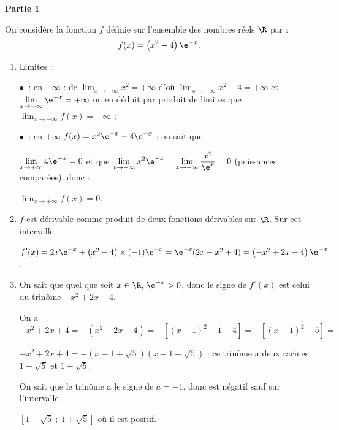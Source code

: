 
\medskip

\textbf{Partie 1}

\medskip

On considère la fonction $f$ définie sur l'ensemble des nombres réels $\R$ par :
\[f(x) = \left(x^2 - 4\right)\e^{-x}.\]


\begin{enumerate}
\item Limites :%

$\bullet~$ : en $- \infty$ : de $\displaystyle\lim_{x \to - \infty}x^2 = + \infty$ d'où 
$\displaystyle\lim_{x \to - \infty}x^2 - 4 = + \infty$ et $\displaystyle\lim_{x \to - \infty}\e^{-x} =
 + \infty$ on en déduit par produit de limites que $\displaystyle\lim_{x \to - \infty} f(x) = + \infty$ ;

$\bullet~$ : en $+ \infty$ $f(x) = x^2\e^{-x} - 4\e^{-x}$ : on sait que 

$\displaystyle\lim_{x \to + \infty}4\e^{-x} = 0$ et que $\displaystyle\lim_{x \to + \infty}x^2\e^{-x} = \displaystyle\lim_{x \to + \infty}\dfrac{x^2}{\e^x} =  0$ (puissances comparées), donc :

$\displaystyle\lim_{x \to + \infty} f(x) = 0$.
\item %
$f$ est dérivable comme produit de deux fonctions dérivables sur $\R$. Sur cet intervalle :

$f'(x) = 2x\e^{-x} + \left(x^2 - 4\right) \times (- 1)\e^{-x} = \e^{-x}(2x - x^2 + 4) = \left(- x^2 + 2x + 4\right)\e^{-x}$.
\item %
On sait que quel que soit $x \in\R,\, \e^{-x} > 0$, donc le signe de $f'(x)$ est celui du trinôme $- x^2 + 2x + 4$.

On a $- x^2 + 2x + 4 = -\left(x^2 - 2x - 4\right) = -\left[(x - 1)^2 - 1 - 4\right] = -\left[(x - 1)^2 - 5\right] =$

$- x^2 + 2x + 4 = - \left(x - 1 + \sqrt 5\right)\left(x - 1 - \sqrt 5\right)$ : ce trinôme a deux racines $1 - \sqrt 5$ et $1 + \sqrt 5$.

On sait que le trinôme a le signe de $a = -1$, donc est négatif sauf sur l'intervalle 

$\left[1 - \sqrt 5~;~1 + \sqrt 5\right]$ où il est positif.


\end{enumerate}
